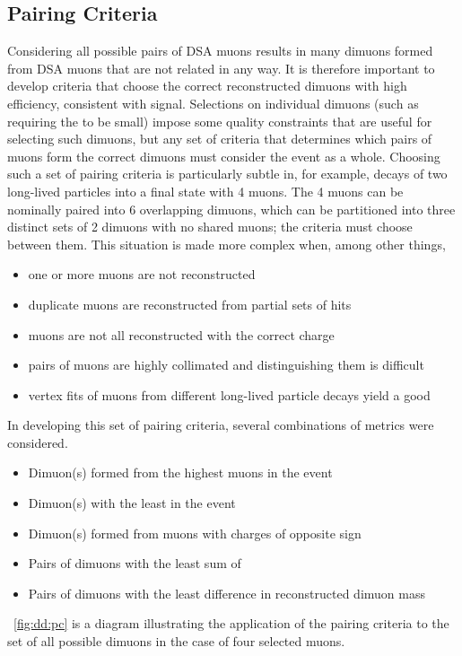 \subsection{Pairing Criteria}
\label{sec:dd:PC}
Considering all possible pairs of DSA muons results in many dimuons formed from DSA muons that are not related in any way.
It is therefore important to develop criteria that choose the correct reconstructed dimuons with high efficiency, consistent with signal.
Selections on individual dimuons (such as requiring the \vchisq to be small) impose some quality constraints that are useful for selecting such dimuons, but any set of criteria that determines which pairs of muons form the correct dimuons must consider the event as a whole.
Choosing such a set of pairing criteria is particularly subtle in, for example, decays of two long-lived particles into a final state with 4 muons.
The 4 muons can be nominally paired into 6 overlapping dimuons, which can be partitioned into three distinct sets of 2 dimuons with no shared muons; the criteria must choose between them.
This situation is made more complex when, among other things,
\begin{itemize}
  \item one or more muons are not reconstructed
  \item duplicate muons are reconstructed from partial sets of hits
  \item muons are not all reconstructed with the correct charge
  \item pairs of muons are highly collimated and distinguishing them is difficult
  \item vertex fits of muons from different long-lived particle decays yield a good \vchisq
\end{itemize}
In developing this set of pairing criteria, several combinations of metrics were considered.
\begin{itemize}
  \item Dimuon(s) formed from the highest \pT muons in the event
  \item Dimuon(s) with the least \vchisq in the event
  \item Dimuon(s) formed from muons with charges of opposite sign
  \item Pairs of dimuons with the least sum of \vchisq
  \item Pairs of dimuons with the least difference in reconstructed dimuon mass
\end{itemize}
\Fig~\ref{fig:dd:pc} is a diagram illustrating the application of the pairing criteria to the set of all possible dimuons in the case of four selected muons.
